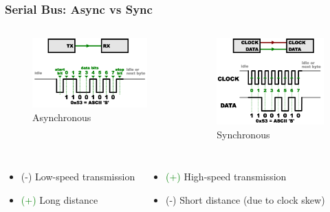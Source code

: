 \documentclass[aspectratio=169,usenames,dvipsnames]{beamer}
\begin{document}
\begin{frame}
  \frametitle{Serial Bus: Async vs Sync}
  \begin{columns}
      \begin{figure}
        \centering
        \includegraphics[scale=0.69]{images/serial-async.png}
        \caption{Asynchronous}
      \end{figure}
      \begin{figure}
        \centering
        \includegraphics[scale=0.69]{images/serial-sync.png}
        \caption{Synchronous}
      \end{figure}
  \end{columns}
  \begin{columns}
      \begin{itemize}
        \item[] \alert{(-)} Low-speed transmission
        \item[] \textcolor{green}{(+)} Long distance
      \end{itemize}
      \begin{itemize}
        \item[] \textcolor{green}{(+)} High-speed transmission
        \item[] \alert{(-)} Short distance (due to clock skew)
      \end{itemize}
  \end{columns}
\end{frame}
\end{document}

